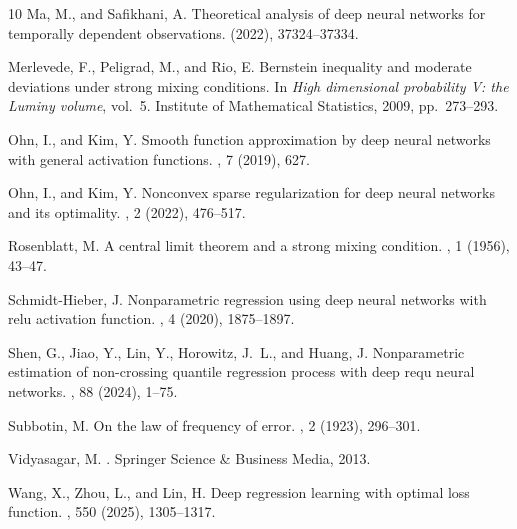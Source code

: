 \documentclass[10pt,twoside]{article}
\numberwithin{equation}{section}
\begin{document}
\begin{thebibliography}{10}
{\sc Ma, M., and Safikhani, A.}
\newblock Theoretical analysis of deep neural networks for temporally dependent
  observations.
 (2022),
  37324--37334.

{\sc Merlevede, F., Peligrad, M., and Rio, E.}
\newblock Bernstein inequality and moderate deviations under strong mixing
  conditions.
\newblock In {\em High dimensional probability V: the Luminy volume}, vol.~5.
  Institute of Mathematical Statistics, 2009, pp.~273--293.

{\sc Ohn, I., and Kim, Y.}
\newblock Smooth function approximation by deep neural networks with general
  activation functions.
, 7 (2019), 627.

{\sc Ohn, I., and Kim, Y.}
\newblock Nonconvex sparse regularization for deep neural networks and its
  optimality.
, 2 (2022), 476--517.

{\sc Rosenblatt, M.}
\newblock A central limit theorem and a strong mixing condition.
, 1 (1956),
  43--47.

{\sc Schmidt-Hieber, J.}
\newblock Nonparametric regression using deep neural networks with relu
  activation function.
, 4 (2020), 1875--1897.

{\sc Shen, G., Jiao, Y., Lin, Y., Horowitz, J.~L., and Huang, J.}
\newblock Nonparametric estimation of non-crossing quantile regression process
  with deep requ neural networks.
, 88 (2024), 1--75.

{\sc Subbotin, M.}
\newblock On the law of frequency of error.
, 2 (1923), 296--301.

{\sc Vidyasagar, M.}
.
\newblock Springer Science \& Business Media, 2013.

{\sc Wang, X., Zhou, L., and Lin, H.}
\newblock Deep regression learning with optimal loss function.
, 550
  (2025), 1305--1317.


\end{thebibliography}
\end{document}
